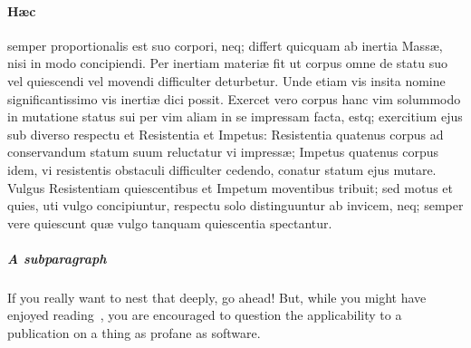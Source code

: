 \documentclass{ansarticle}
\begin{document}
\paragraph{H\ae{}c}
semper proportionalis est suo corpori, neq; differt quicquam ab
inertia Mass\ae{}, nisi in modo concipiendi. Per inertiam materi\ae{} fit ut
corpus omne de statu suo vel quiescendi vel movendi difficulter
deturbetur. Unde etiam vis insita nomine significantissimo vis inerti\ae{}
dici possit. Exercet vero corpus hanc vim solummodo in mutatione
status sui per vim aliam in se impressam facta, estq; exercitium ejus
sub diverso respectu et Resistentia et Impetus: Resistentia quatenus
corpus ad conservandum statum suum reluctatur vi impress\ae{}; Impetus
quatenus corpus idem, vi resistentis obstaculi difficulter cedendo,
conatur statum ejus mutare. Vulgus Resistentiam quiescentibus et
Impetum moventibus tribuit; sed motus et quies, uti vulgo
concipiuntur, respectu solo distinguuntur ab invicem, neq; semper vere
quiescunt qu\ae{} vulgo tanquam quiescentia spectantur.

\subparagraph{A subparagraph} If you really want to nest that deeply, go
ahead! But, while you might have enjoyed
reading~\citet{Wittgenstein1921,Wittgenstein1981}, you are encouraged to
question the applicability to a publication on a thing as profane as
software.



\end{document}
